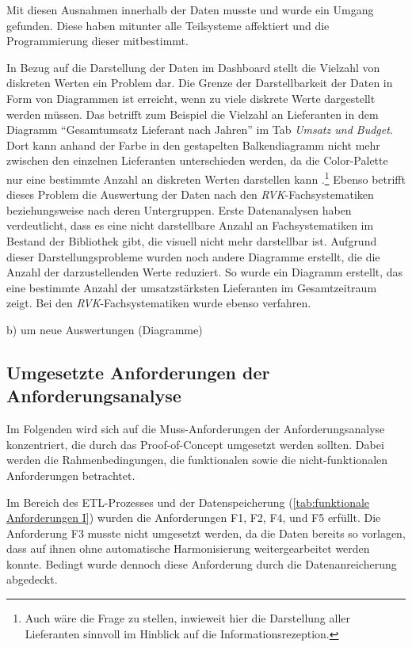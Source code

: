Mit diesen Ausnahmen innerhalb der Daten musste und wurde ein Umgang gefunden. Diese haben mitunter alle Teilsysteme affektiert und
die Programmierung dieser mitbestimmt.

In Bezug auf die Darstellung der Daten im Dashboard stellt die Vielzahl von diskreten Werten ein Problem dar. 
Die Grenze der Darstellbarkeit der Daten in Form von Diagrammen ist erreicht, wenn zu viele diskrete Werte dargestellt werden müssen.
Das betrifft zum Beispiel die Vielzahl an Lieferanten in dem Diagramm \enquote{Gesamtumsatz Lieferant nach Jahren} im Tab \textit{Umsatz und Budget}. 
Dort kann anhand der Farbe in den gestapelten Balkendiagramm nicht mehr zwischen den einzelnen Lieferanten unterschieden werden, da die Color-Palette 
nur eine bestimmte Anzahl an diskreten Werten darstellen kann \cite[Vgl.][]{plotly_discrete_2021}.\footnote{Auch wäre die Frage zu stellen, inwieweit hier die Darstellung aller Lieferanten sinnvoll im Hinblick auf die Informationsrezeption.}
Ebenso betrifft dieses Problem die Auswertung der Daten nach den \textit{\acrshort{RVK}}-Fachsystematiken beziehungsweise nach deren Untergruppen. 
Erste Datenanalysen haben verdeutlicht, dass es eine nicht darstellbare Anzahl an Fachsystematiken im Bestand der Bibliothek gibt, die visuell nicht mehr darstellbar ist.
Aufgrund dieser Darstellungsprobleme wurden noch andere Diagramme erstellt, die die Anzahl der darzustellenden Werte reduziert.
So wurde ein Diagramm erstellt, das eine bestimmte Anzahl der umsatzstärksten Lieferanten im Gesamtzeitraum zeigt. Bei den \textit{\acrshort{RVK}}-Fachsystematiken wurde ebenso
verfahren.

b) um neue Auswertungen (Diagramme)


\subsection{Umgesetzte Anforderungen der Anforderungsanalyse}
Im Folgenden wird sich auf die Muss-Anforderungen der Anforderungsanalyse konzentriert, die durch das Proof-of-Concept
umgesetzt werden sollten. Dabei werden die Rahmenbedingungen, die funktionalen sowie die nicht-funktionalen Anforderungen
betrachtet.

Im Bereich des ETL-Prozesses und der Datenspeicherung (\autoref{tab:funktionale Anforderungen I}) wurden die Anforderungen F1, F2, F4, und F5 erfüllt.
Die Anforderung F3 musste nicht umgesetzt werden, da die Daten bereits so vorlagen, dass auf ihnen ohne automatische Harmonisierung weitergearbeitet werden konnte.
Bedingt wurde dennoch diese Anforderung durch die Datenanreicherung abgedeckt.

